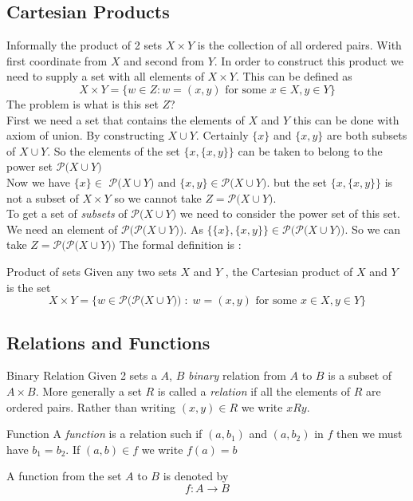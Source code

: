 \documentclass[16pt,a4paper]{article}
\theoremstyle{definition}
\begin{document}
\subsection{Cartesian Products}
Informally the product of 2 sets $X\times Y$ is the collection of all ordered pairs. With first coordinate from $X$ and second from $Y$. In order to construct this product we need to supply a set with all elements of $X\times Y$. This can be defined as
\[X\times Y = \{w\in Z : w = (x,y) \text{ for some } x\in X, y\in Y\}\]   
The problem is what is this set $Z$?\\
First we need a set that contains the elements of $X$ and $Y$ this can be done with axiom of union. By constructing $X\cup Y$. Certainly $\{x\}$ and $\{x,y\}$ are both subsets of $X\cup Y$. So the elements of the set $\{x, \{x,y\}\}$ can be taken to belong to the power set $\mathcal{P(}X\cup Y)$\\
Now we have $\{x\} \in $ $\mathcal{P(}X\cup Y)$ and $\{x,y\} \in\mathcal{P(}X\cup Y)$. but the set $\{x, \{x,y\}\}$ is not a subset of $X\times Y$ so we cannot take $ Z = \mathcal{P(}X\cup Y)$. \\
To get a set of \textit{subsets} of $\mathcal{P(}X\cup Y)$ we need to consider the power set of this set. We need an element of $\mathcal{P(}\mathcal{P(}X\cup Y))$. As $\{\{x\}, \{x,y\}\} \in \mathcal{P(}\mathcal{P(}X\cup Y))$. So we can take $Z = \mathcal{P(}\mathcal{P(}X\cup Y))$ The formal definition is :
\begin{defn}{Product of sets}{}
Given any two sets $X$ and $Y$ , the Cartesian product of $X$ and $Y$ is the set
\[X\times Y = \{w\in \mathcal{P(}\mathcal{P(}X\cup Y)) \;:\; w = (x,y) \text{ for some } x\in X, y\in Y\}\]
\end{defn}

\subsection{Relations and Functions}
\begin{defn}{Binary Relation}{}
Given 2 sets a $A$, $B$ \textit{binary} relation from $A$ to $B$ is a subset of $A\times B$. More generally a set $R$ is called a \textit{relation} if all the elements of $R$ are ordered pairs. Rather than writing $(x,y) \in R$ we write $xRy$.
\end{defn}
\begin{defn}{Function}{}
A \textit{function} is a relation such if $(a,b_1)$ and $(a, b_2)$ in $f$ then we must have $b_1 = b_2$. If $(a,b)\in f$ we write $f(a) = b$ 
\end{defn}
A function from the set $A$ to $B$ is denoted by 
\[f:A \rightarrow B\]
\newpage
\end{document}
